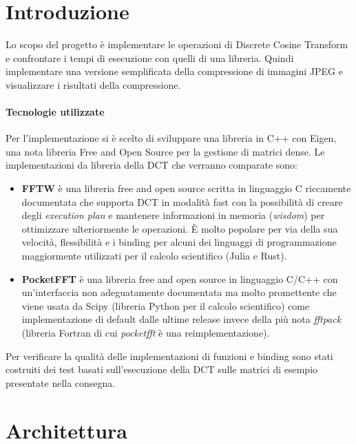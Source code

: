 \documentclass[a4paper,11pt,oneside, table]{article}
\begin{document}
    \printindex
    \tableofcontents
    \renewcommand{\baselinestretch}{1.5}

\section{Introduzione}

Lo scopo del progetto \`e implementare le operazioni di Discrete Cosine Transform e confrontare i tempi di esecuzione con quelli di una libreria. Quindi implementare una versione semplificata della compressione di immagini JPEG e visualizzare i risultati della compressione.

\paragraph{Tecnologie utilizzate}

Per l'implementazione si \`e scelto di sviluppare una libreria in C++ con Eigen, una nota libreria Free and Open Source per la gestione di  matrici dense.
Le implementazioni da libreria della DCT che verranno comparate sono:

\begin{itemize}
  \item \textbf{FFTW} \`e una libreria free and open source scritta in linguaggio C riccamente documentata che supporta DCT in modalit\`a fast con la possibilit\`a di creare degli \textit{execution plan} e mantenere informazioni in memoria (\textit{wisdom}) per ottimizzare ulteriormente le operazioni. \`E molto popolare per via della sua velocit\`a, flessibilit\`a e i binding per alcuni dei linguaggi di programmazione maggiormente utilizzati per il calcolo scientifico (Julia e Rust).
  \item \textbf{PocketFFT} \`e una libreria free and open source in linguaggio C/C++ con un'interfaccia non adeguatamente documentata ma molto promettente che viene usata da Scipy (libreria Python per il calcolo scientifico) come implementazione di default dalle ultime release invece della pi\`u nota \textit{fftpack} (libreria Fortran di cui \textit{pocketfft} \`e una reimplementazione).
\end{itemize}

Per verificare la qualit\`a delle implementazioni di funzioni e binding sono stati costruiti dei test basati sull'esecuzione della DCT sulle matrici di esempio presentate nella consegna.

\section{Architettura}
\end{document}
